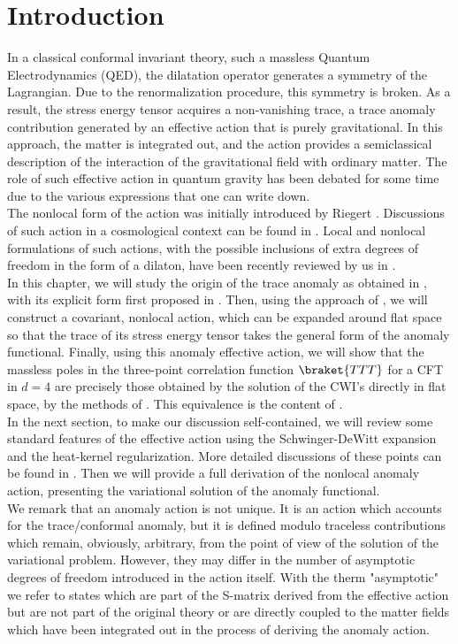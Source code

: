 \documentclass[a4paper,11pt,openright,twoside]{book}
\numberwithin{equation}{section}
\begin{document}
{{\section{Introduction}
In a classical conformal invariant theory, such a massless Quantum Electrodynamics (QED), the dilatation operator generates a symmetry of the Lagrangian. Due to the renormalization procedure, this symmetry is broken. As a result, the stress energy tensor acquires a non-vanishing trace, a trace anomaly contribution generated by an effective action that is purely gravitational. In this approach, the matter is integrated out, and the action provides a semiclassical description of the interaction of the gravitational field with ordinary matter. 
The role of such effective action in quantum gravity has been debated for some time due to the various expressions that one can write down. \\
The nonlocal form of the action was initially introduced by Riegert \cite{1984PhLB..134...56R}. Discussions of such action in a cosmological context can be found in \cite{Antoniadis:2011ib,Antoniadis:2006wq}. Local and nonlocal formulations of such actions, with the possible inclusions of extra degrees of freedom in the form of a dilaton, have been recently reviewed by us in \cite{Coriano:2019dyc}.\\
In this chapter, we will study the origin of the trace anomaly as obtained in \cite{Birrell:1982ix}, with its explicit form first proposed in \cite{Deser:1976yx}. Then, using the approach of \cite{Riegert:1987kt}, we will construct a covariant, nonlocal action, which can be expanded around flat space so that the trace of its stress energy tensor takes the general form of the anomaly functional. Finally, using this anomaly effective action, we will show that the massless poles in the three-point correlation function $\braket{TTT}$ for a CFT in $d=4$ are precisely those obtained by the solution of the CWI's directly in flat space, by the methods of \cite{Bzowski:2013sza}. This equivalence is the content 
of \cite{Coriano:2017mux}. \\
In the next section, to make our discussion self-contained, we will review some standard features of the effective action using the Schwinger-DeWitt expansion and the heat-kernel regularization. More detailed discussions of these points can be found in \cite{Birrell:1982ix}. Then we will provide a full derivation of the nonlocal anomaly action, presenting the variational solution of the anomaly functional. \\
We remark that an anomaly action is not unique. It is an action which accounts for the trace/conformal anomaly, but it is defined modulo traceless contributions which remain, obviously, arbitrary, from the point of view of the solution of the variational problem. However, they may differ in the number of asymptotic degrees of freedom introduced in the action itself. With the therm "asymptotic" we refer to states which are part of the S-matrix derived from the effective action but are not part of the original theory or are directly coupled to the matter fields which have been integrated out in the process of deriving the anomaly action.\\
}}
\end{document}
